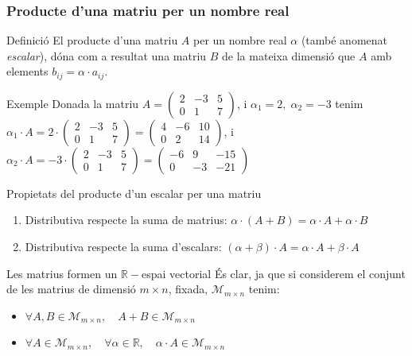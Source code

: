 \documentclass{beamer}
\begin{document}
\begin{frame}\frametitle{Producte d'una matriu per un nombre real}
\begin{block}{Definició}
El producte d'una matriu $A$ per un nombre real $\alpha$ (també anomenat \emph{escalar}), dóna com a resultat una matriu $B$ de la mateixa dimensió que $A$ amb elements $b_{ij}=\alpha\cdot a_{ij}$.
\end{block}
\begin{exampleblock}{Exemple}
Donada la matriu $A=\left(\begin{array}{ccc}
2 & -3 & 5\\
0 & 1 & 7\end{array}\right)$, i $\alpha_{1}=2,$$\;\alpha_{2}=-3$ tenim $\alpha_{1}\cdot A=2\cdot\left(\begin{array}{ccc}
2 & -3 & 5\\
0 & 1 & 7\end{array}\right)=\left(\begin{array}{ccc}
4 & -6 & 10\\
0 & 2 & 14\end{array}\right)$, i $\alpha_{2}\cdot A=-3\cdot\left(\begin{array}{ccc}
2 & -3 & 5\\
0 & 1 & 7\end{array}\right)=
\left(\begin{array}{ccc}
-6 & 9 & -15\\
0 & -3 & -21\end{array}\right)$
\end{exampleblock}
\end{frame}
\begin{frame}{Propietats del producte d'un escalar per una matriu}
\begin{enumerate}
\item
Distributiva respecte la suma de matrius: $\alpha\cdot(A+B)=\alpha\cdot A+\alpha\cdot B$
\item
Distributiva respecte la suma d'escalars: $(\alpha+\beta)\cdot A=\alpha\cdot A+\beta\cdot A$
\end{enumerate}
\begin{alertblock}{Les matrius formen un $\mathbb{R}-$espai vectorial}
És clar, ja que si considerem el conjunt de les matrius de dimensió $m\times n$, fixada, $\mathcal{M}_{m\times n}$ tenim:
\begin{itemize}
\item
$\forall A, B\in \mathcal{M}_{m\times n},\quad A+B\in \mathcal{M}_{m\times n}$
\item
$\forall A\in \mathcal{M}_{m\times n},\quad \forall\alpha\in\mathbb{R},\quad \alpha\cdot A\in\mathcal{M}_{m\times n}$
\end{itemize}
\end{alertblock}
\end{frame}
\end{document}
